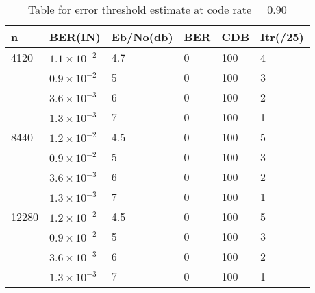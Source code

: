 \begin{table}[H]
\centering
\caption[Table for error threshold estimate at code rate = 0.90, Min Sum decode using quasi cyclic matrix]{Table for error threshold estimate at code rate = 0.90}
\begin{tabular}{|l|l|l|l|l|l|}
\hline
n     & BER(IN) & Eb/No(db) & BER & CDB & Itr(/25) \\ \hline
4120  & $1.1\times10^{-2}$ & 4.7     & 0   & 100 & 4         \\  \hline
      & $0.9\times10^{-2}$ & 5     & 0   & 100 & 3         \\ 
      & $3.6\times10^{-3}$ & 6     & 0   & 100 & 2         \\ 
      & $1.3\times10^{-3}$ & 7     & 0   & 100 & 1         \\ \hline
8440  & $1.2\times10^{-2}$ & 4.5     & 0   & 100 & 5         \\  \hline
      & $0.9\times10^{-2}$ & 5     & 0   & 100 & 3         \\ 
      & $3.6\times10^{-3}$ & 6     & 0   & 100 & 2         \\ 
      & $1.3\times10^{-3}$ & 7     & 0   & 100 & 1         \\ \hline
12280 & $1.2\times10^{-2}$ & 4.5     & 0   & 100 & 5         \\  \hline
      & $0.9\times10^{-2}$ & 5     & 0   & 100 & 3         \\ 
      & $3.6\times10^{-3}$ & 6     & 0   & 100 & 2         \\ 
      & $1.3\times10^{-3}$ & 7     & 0   & 100 & 1         \\ \hline
\end{tabular}
\label{tab:nameForThisTable}
\end{table}

